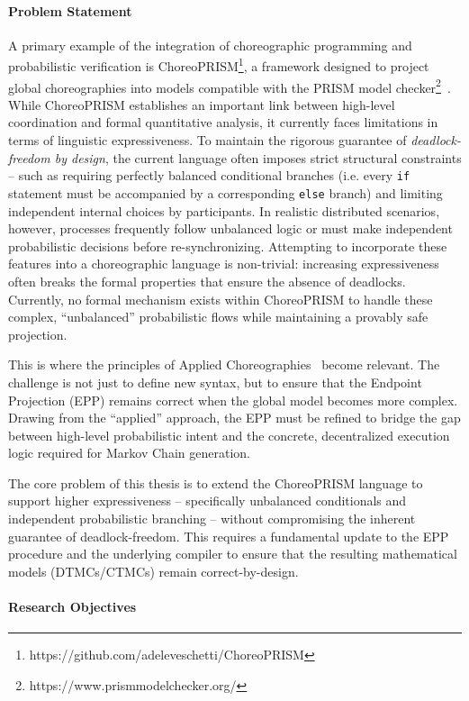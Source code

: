 \paragraph{Problem Statement} A primary example of the integration of choreographic programming and probabilistic verification is ChoreoPRISM\footnote{https://github.com/adeleveschetti/ChoreoPRISM}, a framework designed to project global choreographies into models compatible with the PRISM model checker\footnote{https://www.prismmodelchecker.org/}~\cite{Prism}. While ChoreoPRISM establishes an important link between high-level coordination and formal quantitative analysis, it currently faces limitations in terms of linguistic expressiveness. To maintain the rigorous guarantee of \emph{deadlock-freedom by design}, the current language often imposes strict structural constraints -- such as requiring perfectly balanced conditional branches (i.e. every \texttt{if} statement must be accompanied by a corresponding \texttt{else} branch) and limiting independent internal choices by participants.
In realistic distributed scenarios, however, processes frequently follow unbalanced logic or must make independent probabilistic decisions before re-synchronizing. Attempting to incorporate these features into a choreographic language is non-trivial: increasing expressiveness often breaks the formal properties that ensure the absence of deadlocks. Currently, no formal mechanism exists within ChoreoPRISM to handle these complex, ``unbalanced'' probabilistic flows while maintaining a provably safe projection.

This is where the principles of Applied Choreographies~\cite{Giallorenzo2018} become relevant. The challenge is not just to define new syntax, but to ensure that the Endpoint Projection (EPP) remains correct when the global model becomes more complex. Drawing from the ``applied'' approach, the EPP must be refined to bridge the gap between high-level probabilistic intent and the concrete, decentralized execution logic required for Markov Chain generation.

The core problem of this thesis is to extend the ChoreoPRISM language to support higher expressiveness -- specifically unbalanced conditionals and independent probabilistic branching -- without compromising the inherent guarantee of deadlock-freedom. This requires a fundamental update to the EPP procedure and the underlying compiler to ensure that the resulting mathematical models (DTMCs/CTMCs) remain correct-by-design.

\paragraph{Research Objectives}

